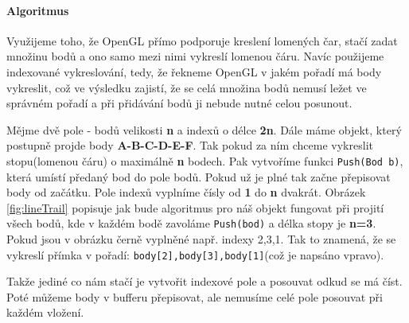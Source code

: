 \paragraph{Algoritmus}Využijeme toho, že OpenGL přímo podporuje kreslení lomených čar, stačí zadat množinu bodů a ono samo mezi nimi vykreslí lomenou čáru. Navíc použijeme indexované vykreslování, tedy, že řekneme OpenGL v jakém pořadí má body vykreslit, což ve výsledku zajistí, že se celá množina bodů nemusí ležet ve správném pořadí a při přidávání bodů ji nebude nutné celou posunout.

Mějme dvě pole - bodů velikosti \textbf{n} a indexů o délce \textbf{2n}.
Dále máme objekt, který postupně projde body \textbf{A-B-C-D-E-F}. Tak pokud za ním chceme vykreslit stopu(lomenou čáru) o maximálně \textbf{n} bodech. Pak vytvoříme funkci \texttt{Push(Bod b)}, která umístí předaný bod do pole bodů. Pokud už je plné tak začne přepisovat body od začátku. Pole indexů vyplníme čísly od \textbf{1} do \textbf{n} dvakrát. Obrázek \ref{fig:lineTrail} popisuje jak bude algoritmus pro náš objekt fungovat při projití všech bodů, kde v každém bodě zavoláme \texttt{Push(bod)} a délka stopy je \textbf{n=3}. Pokud jsou v obrázku černě vyplněné např. indexy 2,3,1. Tak to znamená, že se vykreslí přímka v pořadí: \lstinline|body[2],body[3],body[1]|(což je napsáno vpravo).

Takže jediné co nám stačí je vytvořit indexové pole a posouvat odkud se má číst. Poté můžeme body v bufferu přepisovat, ale nemusíme celé pole posouvat při každém vložení.
\\

